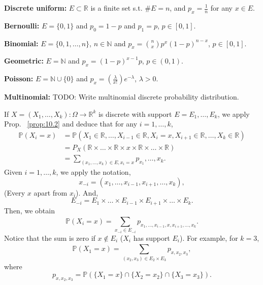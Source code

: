 \begin{myexample}
    \label{myex:Examples_of_discrete_probability_distributions} \hfill

\textbf{Discrete uniform:} $E \subset \mathbb{R}$ is a finite set s.t. $\#E=n$, and $p_x = \frac{1}{n}$ for any $x \in E$.

\textbf{Bernoulli:} $E = \{0,1\} $ and $p_0 = 1-p$ and $p_1 = p$, $p \in [0,1]$.

\textbf{Binomial:} $E=\{0,1, \ldots, n\} $, $n \in \mathbb{N}$ and $p_x=\binom{n}{x} p^{x}(1-p)^{n-x}$, $p \in [0,1]$.

\textbf{Geometric:} $E = \mathbb{N}$ and $p_x = (1-p)^{x-1}p$, $p \in (0,1)$.

\textbf{Poisson:} $E= \mathbb{N} \cup \{0\} $ and $p_x = (\frac{\lambda}{x!})e^{-\lambda}$, $\lambda>0$.

\textbf{Multinomial:} TODO: Write multinomial discrete probability distribution.
\end{myexample}

\begin{remark}[]
    \label{rem:10.3}
    If $X= (X_1, \ldots, X_k): \Omega \to \mathbb{R}^{k}$ is discrete with support $E = E_1, 
    \ldots, E_k$, we apply Prop. ~\ref{prop:10.2} and deduce that for any $i= 1, \ldots, k$,
    \begin{align*}
        \mathbb{P}(X_i = x) &= \mathbb{P}(X_1 \in \mathbb{R}, \ldots, X_{i-1}\in \mathbb{R},
        X_i = x, X_{i+1} \in \mathbb{R}, \ldots, X_k \in \mathbb{R}) \\
        &= P_X(\mathbb{R} \times \ldots\times \mathbb{R}\times  {x}\times\mathbb{R}\times 
        \ldots\times \mathbb{R}) \\
        &= \sum_{(x_1, \ldots, x_k)\in E, x_{i}=x}^{ } p_{x_1}, \ldots, x_k
    .\end{align*}
    Given $i=1,\ldots,k$, we apply the notation,
    \[
    x_{-i}=(x_1, \ldots, x_{i-1}, x_{i+1}, \ldots, x_k)
    ,\] 
    (Every $x$ apart from $x_{i}$). And,
    \[
    E_{-i} = E_1\times \ldots\times E_{i-1}\times E_{i+1}\times \ldots\times E_k
    .\] 
    Then, we obtain
    \[
    \mathbb{P}(X_i = x)= \sum_{x_{-i} \in E_{-i}}^{ } p_{x_1, \ldots, x_{i-1},x,x_{i+1}, \ldots, x_k}
    .\] 
    Notice that the sum is zero if $x \not\in E_i$ ($X_i $ has support $E_i$).
    For example, for $k=3$,
    \[
    \mathbb{P}(X_1 = x) = \sum_{(x_2, x_3)\in E_2\times E_3}^{} p_{x, x_2,x_3}
    ,\] 
    where
    \[
    p_{x, x_2,x_3} = \mathbb{P}(\{X_1=x\} \cap \{X_2 = x_2\} \cap \{X_3 = x_3\} )
    .\] 
\end{remark}

